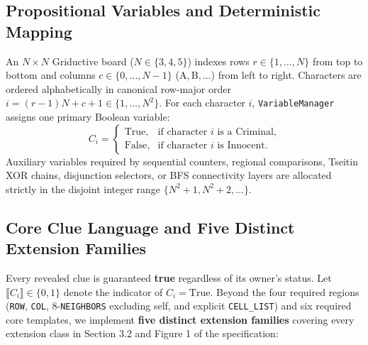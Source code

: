 \documentclass[11pt,a4paper]{article}
\begin{document}
\subsection{Propositional Variables and Deterministic Mapping}
An $N \times N$ Griductive board ($N \in \{3, 4, 5\}$) indexes rows $r \in \{1, \dots, N\}$ from top to bottom and columns $c \in \{0, \dots, N-1\}$ ($\text{A}, \text{B}, \dots$) from left to right. Characters are ordered alphabetically in canonical row-major order $i = (r - 1)N + c + 1 \in \{1, \dots, N^2\}$. For each character $i$, \texttt{VariableManager} assigns one primary Boolean variable:
\[
C_i = \begin{cases}
\text{True}, & \text{if character } i \text{ is a Criminal,} \\
\text{False}, & \text{if character } i \text{ is Innocent.}
\end{cases}
\]
Auxiliary variables required by sequential counters, regional comparisons, Tseitin XOR chains, disjunction selectors, or BFS connectivity layers are allocated strictly in the disjoint integer range $\{N^2 + 1, N^2 + 2, \dots\}$.

\subsection{Core Clue Language and Five Distinct Extension Families}
Every revealed clue is guaranteed \textbf{true} regardless of its owner's status. Let $\llbracket C_i \rrbracket \in \{0, 1\}$ denote the indicator of $C_i = \text{True}$. Beyond the four required regions (\texttt{ROW}, \texttt{COL}, 8-\texttt{NEIGHBORS} excluding self, and explicit \texttt{CELL\_LIST}) and six required core templates, we implement \textbf{five distinct extension families} covering every extension class in Section 3.2 and Figure 1 of the specification:
\end{document}
